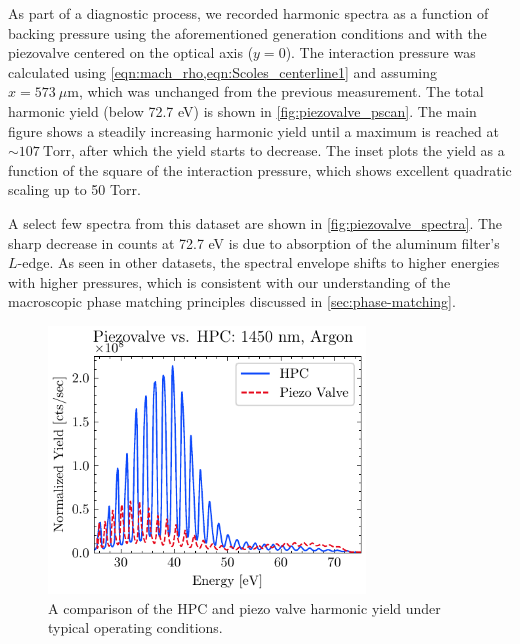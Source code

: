 As part of a diagnostic process, we recorded harmonic spectra as a function of backing pressure using the aforementioned generation conditions and with the piezovalve centered on the optical axis ($y=0$). The interaction pressure was calculated using \cref{eqn:mach_rho,eqn:Scoles_centerline1} and assuming $x = 573 \ \mu \textrm{m}$, which was unchanged from the previous measurement. The total harmonic yield (below 72.7 eV) is shown in \cref{fig:piezovalve_pscan}. The main figure shows a steadily increasing harmonic yield until a maximum is reached at $\sim 107 \ \textrm{Torr}$, after which the yield starts to decrease. The inset plots the yield as a function of the square of the interaction pressure, which shows excellent quadratic scaling up to 50 Torr.

A select few spectra from this dataset are shown in \cref{fig:piezovalve_spectra}. The sharp decrease in counts at 72.7 eV is due to absorption of the aluminum filter's $L$-edge. As seen in other datasets, the spectral envelope shifts to higher energies with higher pressures, which is consistent with our understanding of the macroscopic phase matching principles discussed in \cref{sec:phase-matching}.

\begin{figure}
	\centering
	\includegraphics[width=0.75\textwidth]{figures/chap3/HPC_vs_piezovalve.pdf}
	\caption{A comparison of the HPC and piezo valve harmonic yield under typical operating conditions.}
	\label{fig:HPC_vs_piezovalve}
\end{figure}

